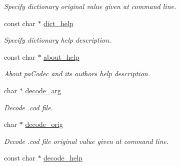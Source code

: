 \begin{DoxyCompactItemize}
\begin{DoxyCompactList}\small\item\em Specify dictionary original value given at command line. \end{DoxyCompactList}\item 
\hypertarget{structgengetopt__args__info_a5ed6fabb507e7fac93b6a200d9919fe0}{}const char $\ast$ \hyperlink{structgengetopt__args__info_a5ed6fabb507e7fac93b6a200d9919fe0}{dict\+\_\+help}\label{structgengetopt__args__info_a5ed6fabb507e7fac93b6a200d9919fe0}

\begin{DoxyCompactList}\small\item\em Specify dictionary help description. \end{DoxyCompactList}\item 
\hypertarget{structgengetopt__args__info_abd0135c7c74fb9d708724964c3f1af95}{}const char $\ast$ \hyperlink{structgengetopt__args__info_abd0135c7c74fb9d708724964c3f1af95}{about\+\_\+help}\label{structgengetopt__args__info_abd0135c7c74fb9d708724964c3f1af95}

\begin{DoxyCompactList}\small\item\em About pa\+Codec and its authors help description. \end{DoxyCompactList}\item 
\hypertarget{structgengetopt__args__info_a845088da21fe9086286e44338b135e3e}{}char $\ast$ \hyperlink{structgengetopt__args__info_a845088da21fe9086286e44338b135e3e}{decode\+\_\+arg}\label{structgengetopt__args__info_a845088da21fe9086286e44338b135e3e}

\begin{DoxyCompactList}\small\item\em Decode .cod file. \end{DoxyCompactList}\item 
\hypertarget{structgengetopt__args__info_a80e3435e1926734f1ac44212a9aefd7e}{}char $\ast$ \hyperlink{structgengetopt__args__info_a80e3435e1926734f1ac44212a9aefd7e}{decode\+\_\+orig}\label{structgengetopt__args__info_a80e3435e1926734f1ac44212a9aefd7e}

\begin{DoxyCompactList}\small\item\em Decode .cod file original value given at command line. \end{DoxyCompactList}\item 
\hypertarget{structgengetopt__args__info_a0f47a3794e06f0de34bfb11a76bf5aee}{}const char $\ast$ \hyperlink{structgengetopt__args__info_a0f47a3794e06f0de34bfb11a76bf5aee}{decode\+\_\+help}\label{structgengetopt__args__info_a0f47a3794e06f0de34bfb11a76bf5aee}


\end{DoxyCompactItemize}
